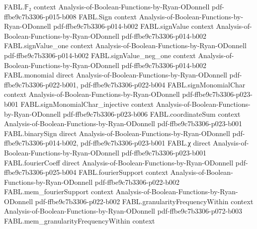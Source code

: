 \begin{theorem}
\label{FABL.exists_CNF_of_decisionTree}
\leanok
{}
\proofstep
  {FABL.𝔽₂}
  {context}
  {Analysis-of-Boolean-Functions-by-Ryan-ODonnell}
  {pdf-ffbe9c7b3306-p015-b008}
\proofstep
  {FABL.Sign}
  {context}
  {Analysis-of-Boolean-Functions-by-Ryan-ODonnell}
  {pdf-ffbe9c7b3306-p014-b002}
\proofstep
  {FABL.signValue}
  {context}
  {Analysis-of-Boolean-Functions-by-Ryan-ODonnell}
  {pdf-ffbe9c7b3306-p014-b002}
\proofstep
  {FABL.signValue_one}
  {context}
  {Analysis-of-Boolean-Functions-by-Ryan-ODonnell}
  {pdf-ffbe9c7b3306-p014-b002}
\proofstep
  {FABL.signValue_neg_one}
  {context}
  {Analysis-of-Boolean-Functions-by-Ryan-ODonnell}
  {pdf-ffbe9c7b3306-p014-b002}
\proofstep
  {FABL.monomial}
  {direct}
  {Analysis-of-Boolean-Functions-by-Ryan-ODonnell}
  {pdf-ffbe9c7b3306-p022-b001,
    pdf-ffbe9c7b3306-p022-b004}
\proofstep
  {FABL.signMonomialChar}
  {context}
  {Analysis-of-Boolean-Functions-by-Ryan-ODonnell}
  {pdf-ffbe9c7b3306-p023-b001}
\proofstep
  {FABL.signMonomialChar_injective}
  {context}
  {Analysis-of-Boolean-Functions-by-Ryan-ODonnell}
  {pdf-ffbe9c7b3306-p023-b006}
\proofstep
  {FABL.coordinateSum}
  {context}
  {Analysis-of-Boolean-Functions-by-Ryan-ODonnell}
  {pdf-ffbe9c7b3306-p023-b001}
\proofstep
  {FABL.binarySign}
  {direct}
  {Analysis-of-Boolean-Functions-by-Ryan-ODonnell}
  {pdf-ffbe9c7b3306-p014-b002,
    pdf-ffbe9c7b3306-p023-b001}
\proofstep
  {FABL.χ}
  {direct}
  {Analysis-of-Boolean-Functions-by-Ryan-ODonnell}
  {pdf-ffbe9c7b3306-p023-b001}
\proofstep
  {FABL.fourierCoeff}
  {direct}
  {Analysis-of-Boolean-Functions-by-Ryan-ODonnell}
  {pdf-ffbe9c7b3306-p025-b004}
\proofstep
  {FABL.fourierSupport}
  {context}
  {Analysis-of-Boolean-Functions-by-Ryan-ODonnell}
  {pdf-ffbe9c7b3306-p022-b002}
\proofstep
  {FABL.mem_fourierSupport}
  {context}
  {Analysis-of-Boolean-Functions-by-Ryan-ODonnell}
  {pdf-ffbe9c7b3306-p022-b002}
\proofstep
  {FABL.granularityFrequencyWithin}
  {context}
  {Analysis-of-Boolean-Functions-by-Ryan-ODonnell}
  {pdf-ffbe9c7b3306-p072-b003}
\proofstep
  {FABL.mem_granularityFrequencyWithin}
  {context}

\end{theorem}
